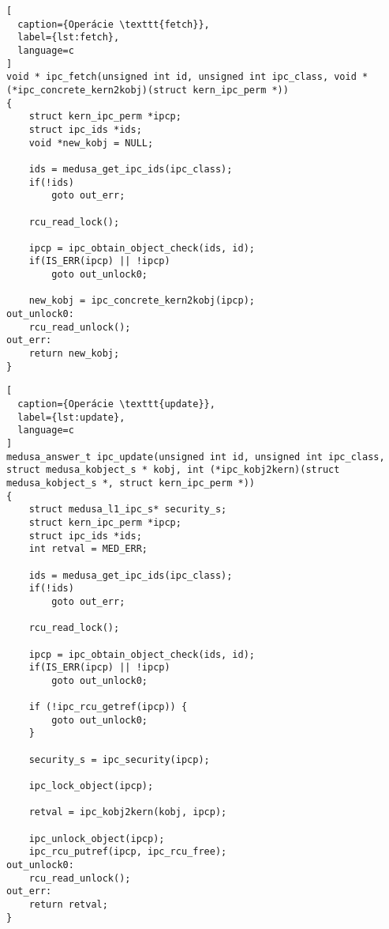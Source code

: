 \begin{lstlisting}[
  caption={Operácie \texttt{fetch}},
  label={lst:fetch},
  language=c
]
void * ipc_fetch(unsigned int id, unsigned int ipc_class, void * (*ipc_concrete_kern2kobj)(struct kern_ipc_perm *))
{
	struct kern_ipc_perm *ipcp;
	struct ipc_ids *ids;
	void *new_kobj = NULL;

	ids = medusa_get_ipc_ids(ipc_class);
	if(!ids)
		goto out_err;

	rcu_read_lock();

	ipcp = ipc_obtain_object_check(ids, id);
	if(IS_ERR(ipcp) || !ipcp)
		goto out_unlock0;

	new_kobj = ipc_concrete_kern2kobj(ipcp);
out_unlock0:
	rcu_read_unlock();
out_err:
	return new_kobj;
}
\end{lstlisting}

\begin{lstlisting}[
  caption={Operácie \texttt{update}},
  label={lst:update},
  language=c
]
medusa_answer_t ipc_update(unsigned int id, unsigned int ipc_class, struct medusa_kobject_s * kobj, int (*ipc_kobj2kern)(struct medusa_kobject_s *, struct kern_ipc_perm *))
{
	struct medusa_l1_ipc_s* security_s;
	struct kern_ipc_perm *ipcp;
	struct ipc_ids *ids;
	int retval = MED_ERR;
	
	ids = medusa_get_ipc_ids(ipc_class);
	if(!ids)
		goto out_err;
	
	rcu_read_lock();

	ipcp = ipc_obtain_object_check(ids, id);
	if(IS_ERR(ipcp) || !ipcp)
		goto out_unlock0;

	if (!ipc_rcu_getref(ipcp)) {
		goto out_unlock0;
	}

	security_s = ipc_security(ipcp);

	ipc_lock_object(ipcp);

	retval = ipc_kobj2kern(kobj, ipcp);
		
	ipc_unlock_object(ipcp);
	ipc_rcu_putref(ipcp, ipc_rcu_free);
out_unlock0:
	rcu_read_unlock();
out_err:
	return retval;
}
\end{lstlisting}